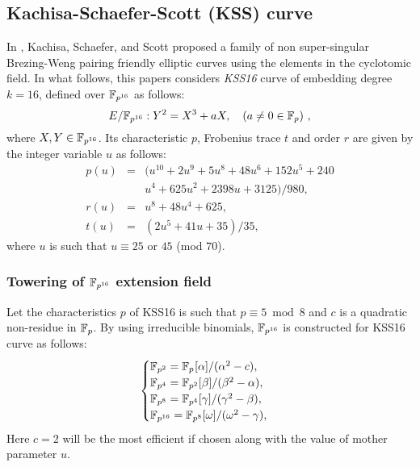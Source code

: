 \subsection{Kachisa-Schaefer-Scott (KSS) curve \cite{kss}}
 In  \cite{kss}, Kachisa, Schaefer, and Scott proposed a family of non super-singular Brezing-Weng pairing friendly elliptic curves using the elements in the cyclotomic field.  In what follows, this papers considers \textit{KSS16} curve of embedding degree $k =16$, defined over $\mathbb{F}_{p^{16}}$ as follows:
\begin{equation}\label{eq:KSS_16}
E/\mathbb{F}_{p^{16}}:Y^2=X^3+aX, \quad \mbox{($a \neq 0 \in {\mathbb{F}}_{p}$) },
\end{equation}
 where $X,Y \in \mathbb{F}_{p^{16}}$. Its characteristic $p$, Frobenius trace $t$ and order $r$ are given by the integer variable $u$ as follows:
\begin{subequations}
\begin{eqnarray}
p(u) &= & (u^{10} +2u^9 +5u^8 +48u^6 +152u^5 +240 \nonumber \\
&&u^4+625u^2 +2398u+3125)/980,  \\\label{eq:kss_16_char}
r(u) &= & u^8 +48u^4 +625,\label{eq:kss_16_degree}  \\
t(u) &=& (2u^5 +41u+35)/35, \label{eq:kss_16_trace} 
\end{eqnarray}
\end{subequations} 
where $u$ is such that $u \equiv 25$ or $45$ (mod $70$).

\subsubsection{Towering of $\mathbb{F}_{p^{16}}$ extension field}
Let the characteristics $p$ of KSS16 is such that  $p \equiv 5 \bmod 8$  and $c$ is a quadratic non-residue in ${\mathbb{F}}_{p}$. By using irreducible binomials, $\mathbb{F}_{p^{16}}$ is constructed for KSS16 curve  as follows:
\begin{equation}\label{eq_bls_towering}
\begin{cases}
{\mathbb{F}}_{p^{2}} = {\mathbb{F}}_{p^{}}[\alpha]/(\alpha^2-c),  \\ 
{\mathbb{F}}_{p^{4}} = {\mathbb{F}}_{p^{2}}[\beta]/(\beta^2-\alpha),  \\ 
{\mathbb{F}}_{p^{8}} = {\mathbb{F}}_{p^{4}}[\gamma]/(\gamma^2-\beta), \\ 
{\mathbb{F}}_{p^{16}} = {\mathbb{F}}_{p^{8}}[\omega]/(\omega^2-\gamma), \\ 
\end{cases}
\end{equation}
Here $ c = 2$ will be the most efficient if chosen along with the value of mother parameter $u$.

